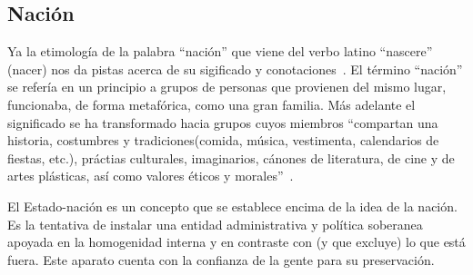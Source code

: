 \subsection{Nación}

Ya la etimología de la palabra ``nación'' que viene del verbo latino ``nascere'' (nacer) nos da pistas acerca de su sigificado y conotaciones~\autocite[189]{SzIr2009}.
El término ``nación'' se refería en un principio a grupos de personas que provienen del mismo lugar, funcionaba, de forma metafórica, como una gran familia.
Más adelante el significado se ha transformado hacia grupos cuyos miembros
``compartan una historia, costumbres y tradiciones(comida, música, vestimenta, calendarios de fiestas, etc.), práctias culturales, imaginarios, cánones de literatura, de cine y de artes plásticas, así como valores éticos y morales''~\autocite[190]{SzIr2009}.

El Estado-nación es un concepto que se establece encima de la idea de la nación.
Es la tentativa de instalar una entidad administrativa y política soberanea apoyada en la homogenidad interna y en contraste con (y que excluye) lo que está fuera.
Este aparato cuenta con la confianza de la gente para su preservación.


